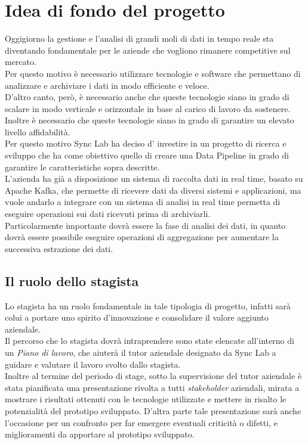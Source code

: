 \section{Idea di fondo del progetto}
Oggigiorno la gestione e l'analisi di grandi moli di dati in tempo reale sta diventando fondamentale 
per le aziende che vogliono rimanere competitive sul mercato. \\ 
Per questo motivo è necessario utilizzare tecnologie e software che permettano di analizzare e archiviare 
i dati in modo efficiente e veloce. \\
D'altro canto, però, è necessario anche che queste tecnologie siano in grado di scalare in modo verticale e orizzontale in base al carico 
di lavoro da sostenere. Inoltre è necessario che queste tecnologie siano in grado di garantire un elevato livello affidabilità. \\
Per questo motivo Sync Lab ha deciso d' investire in un progetto di ricerca e sviluppo che ha come obiettivo quello di creare 
una \gls{Data Pipeline}{} in grado di garantire le caratteristiche sopra descritte. \\
L'azienda ha già a disposizione un sistema di raccolta dati in  real time, basato su Apache Kafka, che permette di ricevere dati da
diversi sistemi e applicazioni, ma vuole andarlo a integrare con un sistema di analisi in real time permetta di eseguire operazioni 
sui dati ricevuti prima di archiviarli. \\
Particolarmente importante dovrà essere la fase di analisi dei dati, in quanto dovrà essere possibile eseguire operazioni di aggregazione
per aumentare la successiva estrazione dei dati. 
\subsection{Il ruolo dello stagista}
Lo stagista ha un ruolo fondamentale in tale tipologia di progetto, infatti sarà colui a portare uno spirito d'innovazione e consolidare il valore aggiunto 
aziendale. \\
Il percorso che lo stagista dovrà intraprendere sono state elencate all'interno di un \textit{Piano di lavoro}, che aiuterà il tutor 
aziendale designato da Sync Lab a guidare e valutare il lavoro svolto dallo stagista. \\
Inoltre al termine del periodo di stage, sotto la supervisione del tutor aziendale è stata pianificata una presentazione rivolta a tutti \textit{stakeholder} aziendali, mirata a 
mostrare i risultati ottenuti con le tecnologie utilizzate e mettere in risalto le potenzialità del prototipo sviluppato. D'altra parte tale presentazione sarà anche l'occasione 
per un confronto per far emergere eventuali criticità o difetti,  e miglioramenti da apportare al prototipo sviluppato.
\pagebreak

